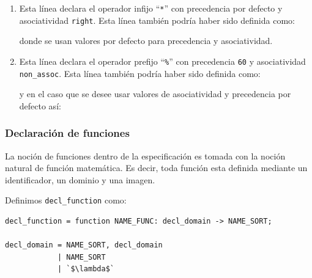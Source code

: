 \begin{enumerate}

\item 
\begin{center}
\end{center}
\vspace{0.2cm}
Esta línea declara el operador infijo ``\texttt{*}'' con precedencia por defecto y asociatividad \texttt{right}. Esta línea también podría haber sido definida como:
\vspace{0.2cm}
\begin{center}
\end{center}
\vspace{0.2cm}
donde se usan valores por defecto para precedencia y asociatividad.

\item 
\begin{center}
\end{center}
\vspace{0.2cm}
Esta línea declara el operador prefijo ``\texttt{\%}'' con precedencia \texttt{60} y asociatividad \texttt{non\_assoc}. Esta línea también podría haber sido definida como:
\vspace{0.2cm}

\begin{center}
\end{center}
\vspace{0.2cm}
y en el caso que se desee usar valores de asociatividad y precedencia por defecto así:
\vspace{0.2cm}

\begin{center}
\end{center}
\end{enumerate}
\subsubsection{Declaración de funciones}
La noción de funciones dentro de la especificación es tomada con la noción natural de función matemática. Es decir, toda función esta definida mediante un identificador, un dominio y una imagen.

Definimos \texttt{decl\_function} como:

\begin{lstlisting}[frame=shadowbox, rulesepcolor=\color{azul}, language=specmag]
decl_function = function NAME_FUNC: decl_domain -> NAME_SORT;

decl_domain = NAME_SORT, decl_domain
            | NAME_SORT
            | `$\lambda$`
\end{lstlisting}
\vspace{0.3cm}

